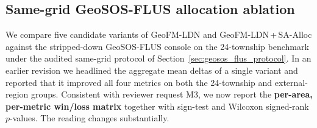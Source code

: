 \documentclass{article}
\begin{document}
\subsection{Same-grid GeoSOS-FLUS allocation ablation}
\label{sec:geosos_flus_results}

We compare five candidate variants of GeoFM-LDN and GeoFM-LDN\,+\,SA-Alloc against the stripped-down GeoSOS-FLUS console on the 24-township benchmark under the audited same-grid protocol of Section~\ref{sec:geosos_flus_protocol}. In an earlier revision we headlined the aggregate mean deltas of a single variant and reported that it improved all four metrics on both the 24-township and external-region groups. Consistent with reviewer request M3, we now report the \textbf{per-area, per-metric win/loss matrix} together with sign-test and Wilcoxon signed-rank $p$-values. The reading changes substantially.
\end{document}
